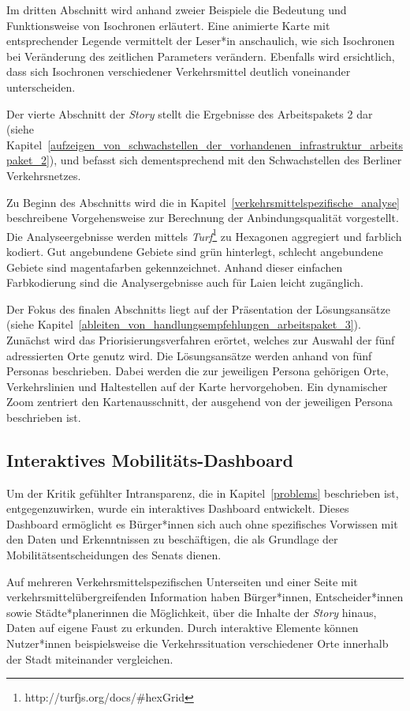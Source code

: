 Im dritten Abschnitt wird anhand zweier Beispiele die Bedeutung und Funktionsweise von Isochronen erläutert. Eine animierte Karte mit entsprechender Legende vermittelt der Leser*in anschaulich, wie sich Isochronen bei Veränderung des zeitlichen Parameters verändern. Ebenfalls wird ersichtlich, dass sich Isochronen verschiedener Verkehrsmittel deutlich voneinander unterscheiden.

Der vierte Abschnitt der \emph{Story} stellt die Ergebnisse des Arbeitspakets 2 dar (siehe Kapitel~\ref{aufzeigen_von_schwachstellen_der_vorhandenen_infrastruktur_arbeitspaket_2}), und befasst sich dementsprechend  mit den Schwachstellen des Berliner Verkehrsnetzes.

Zu Beginn des Abschnitts wird die in Kapitel~\ref{verkehrsmittelspezifische_analyse} beschreibene Vorgehensweise zur Berechnung der Anbindungsqualität vorgestellt. Die Analyseergebnisse werden mittels \emph{Turf}\footnote{http://turfjs.org/docs/\#hexGrid} zu Hexagonen aggregiert und farblich kodiert. Gut angebundene Gebiete sind  grün hinterlegt, schlecht angebundene Gebiete sind magentafarben gekennzeichnet. Anhand dieser einfachen Farbkodierung sind die Analysergebnisse auch für Laien leicht zugänglich.

Der Fokus des finalen Abschnitts liegt auf der Präsentation der Lösungsansätze (siehe Kapitel~\ref{ableiten_von_handlungsempfehlungen_arbeitspaket_3}). Zunächst wird das Priorisierungsverfahren erörtet, welches zur Auswahl der fünf adressierten Orte genutz wird. Die Lösungsansätze werden anhand von fünf Personas beschrieben. Dabei werden die zur jeweiligen Persona gehörigen Orte, Verkehrslinien und Haltestellen auf der Karte hervorgehoben. Ein dynamischer Zoom zentriert den Kartenausschnitt, der ausgehend von der jeweiligen Persona beschrieben ist.

\subsection{Interaktives Mobilitäts-Dashboard}
\label{interaktives_mobilitaets_dashboard}

Um der Kritik gefühlter Intransparenz, die in Kapitel~\ref{problems} beschrieben ist, entgegenzuwirken, wurde ein interaktives Dashboard entwickelt. Dieses Dashboard ermöglicht es Bürger*innen sich auch ohne spezifisches Vorwissen mit den Daten und Erkenntnissen zu beschäftigen, die als Grundlage der Mobilitätsentscheidungen des Senats dienen.

Auf mehreren Verkehrsmittelspezifischen Unterseiten und einer Seite mit verkehrsmittelübergreifenden Information haben Bürger*innen, Entscheider*innen sowie Städte*planerinnen die Möglichkeit, über die Inhalte der \emph{Story} hinaus, Daten auf eigene Faust zu erkunden. Durch interaktive Elemente können Nutzer*innen beispielsweise die Verkehrssituation verschiedener Orte innerhalb der Stadt miteinander vergleichen.


